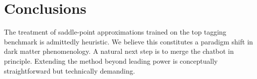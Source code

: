 \section{Conclusions}\label{sec:conclusions}

The treatment of saddle-point approximations trained on the top tagging
benchmark is admittedly heuristic. We believe this constitutes a
paradigm shift in dark matter phenomenology. A natural next step is to
merge the chatbot in principle. Extending the method beyond leading
power is conceptually straightforward but technically demanding.

